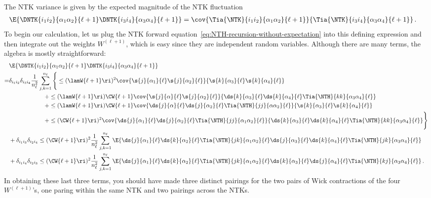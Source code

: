 The NTK variance is given by the expected magnitude of the NTK fluctuation
\begin{align}\label{eq:NTHvR_primitive_before}
&\E{\DNTK{i_1i_2}{\alpha_1\alpha_2}{\ell+1}\DNTK{i_3i_4}{\alpha_3\alpha_4}{\ell+1}}=\cov{\Tia{\NTK}{i_1i_2}{\alpha_1\alpha_2}{\ell+1}}{\Tia{\NTK}{i_3i_4}{\alpha_3\alpha_4}{\ell+1}}\, .
\end{align}
To begin our calculation, let us plug the NTK forward equation~\eqref{eq:NTH-recursion-without-expectation} into this defining expression %
and then integrate out the weights $W^{(\ell+1)}$, which is easy since they are independent random variables. Although there are many terms, the algebra is mostly straightforward:
\begin{align}\label{eq:NTHvR_primitive}
&\E{\DNTK{i_1i_2}{\alpha_1\alpha_2}{\ell+1}\DNTK{i_3i_4}{\alpha_3\alpha_4}{\ell+1}}\\
=&\delta_{i_1i_2}\delta_{i_3i_4}\frac{1}{n_{\ell}^2}\sum_{j,k=1}^{n_{\ell}}\Bigg\{\le(\lamW{\ell+1}\ri)^2\cov{\s{j}{\alpha_1}{\ell} \s{j}{\alpha_2}{\ell}}{\s{k}{\alpha_3}{\ell} \s{k}{\alpha_4}{\ell}}  \notag \\
&\quad \quad \quad \quad \quad \quad +\le(\lamW{\ell+1}\ri)\CW{\ell+1}\cov{\s{j}{\alpha}{\ell} \s{j}{\alpha_2}{\ell}}{\ds{k}{\alpha_3}{\ell} \ds{k}{\alpha_4}{\ell} \Tia{\NTH}{kk}{\alpha_3\alpha_4}{\ell} } \nonumber\\
&\quad \quad \quad \quad \quad \quad +\le(\lamW{\ell+1}\ri)\CW{\ell+1}\cov{\ds{j}{\alpha}{\ell} \ds{j}{\alpha_2}{\ell}\Tia{\NTH}{jj}{\alpha\alpha_2}{\ell}}{\s{k}{\alpha_3}{\ell} \s{k}{\alpha_4}{\ell}  }\nonumber\\
&\quad \quad \quad \quad \quad \quad +\le(\CW{\ell+1}\ri)^2\cov{\ds{j}{\alpha_1}{\ell} \ds{j}{\alpha_2}{\ell}\Tia{\NTH}{jj}{\alpha_1\alpha_2}{\ell}}{\ds{k}{\alpha_3}{\ell} \ds{k}{\alpha_4}{\ell} \Tia{\NTH}{kk}{\alpha_3\alpha_4}{\ell} }\Bigg\}\nonumber\\
&+\delta_{i_1i_3}\delta_{i_2 i_4}\le(\CW{\ell+1}\ri)^2\frac{1}{n_{\ell}^2}\sum_{j,k=1}^{n_{\ell}}\E{\ds{j}{\alpha_1}{\ell} \ds{k}{\alpha_2}{\ell}\Tia{\NTH}{jk}{\alpha_1\alpha_2}{\ell} \ds{j}{\alpha_3}{\ell} \ds{k}{\alpha_4}{\ell} \Tia{\NTH}{jk}{\alpha_3\alpha_4}{\ell} }\nonumber\\
&+\delta_{i_1i_4}\delta_{i_2 i_3}\le(\CW{\ell+1}\ri)^2\frac{1}{n_{\ell}^2}\sum_{j,k=1}^{n_{\ell}}\E{\ds{j}{\alpha_1}{\ell} \ds{k}{\alpha_2}{\ell}\Tia{\NTH}{jk}{\alpha_1\alpha_2}{\ell} \ds{k}{\alpha_3}{\ell} \ds{j}{\alpha_4}{\ell} \Tia{\NTH}{kj}{\alpha_3\alpha_4}{\ell} }\, .\nonumber
\end{align}
In obtaining these last three terms,
you should have made three distinct pairings for the two pairs of Wick contractions of the four $W^{(\ell+1)}$'s, one paring %
within the same NTK and two pairings 
across the NTKs.


